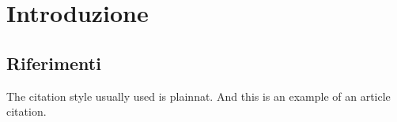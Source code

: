 \chapter{Introduzione}
\section{Riferimenti}
The citation style usually used is plainnat. 
And this is an example of an article citation\cite{einstein}.